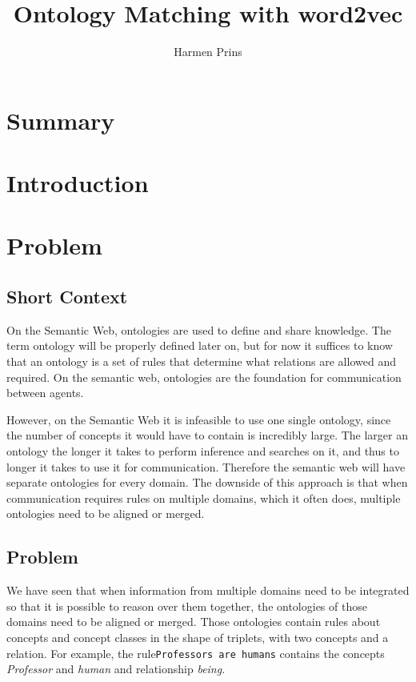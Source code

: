 \documentclass{article}
\title{Ontology Matching with word2vec}
\author{Harmen Prins}
\begin{document}
 \maketitle
 
 \section*{Summary}
 
 \tableofcontents
 
 \section{Introduction}
 
 \section{Problem}
 \subsection{Short Context}
 On the Semantic Web, ontologies are used to define and share knowledge. The term ontology will be properly defined later on, but for now it suffices to know that an ontology is a set of rules that determine what relations are allowed and required. On the semantic web, ontologies are the foundation for communication between agents.
 
 However, on the Semantic Web it is infeasible to use one single ontology, since the number of concepts it would have to contain is incredibly large. The larger an ontology the longer it takes to perform inference and searches on it, and thus to longer it takes to use it for communication. Therefore the semantic web will have separate ontologies for every domain. The downside of this approach is that when communication requires rules on multiple domains, which it often does, multiple ontologies need to be aligned or merged.
 \subsection{Problem}
 We have seen that when information from multiple domains need to be integrated so that it is possible to reason over them together, the ontologies of those domains need to be aligned or merged. Those ontologies contain rules about concepts and concept classes in the shape of triplets, with two concepts and a relation. For example, the rule{\tt Professors are humans} contains the concepts \emph{Professor} and \emph{human} and relationship \emph{being}.
 
\end{document}
